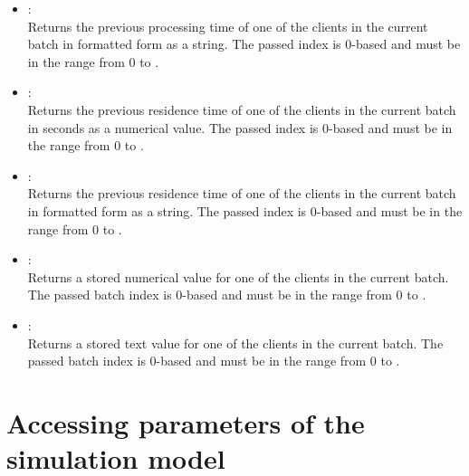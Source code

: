 \begin{itemize}
\item
{}:\\
Returns the previous processing time of one of the clients in the current batch in formatted form as a string.
The passed index is 0-based and must be in the range from 0 to .
	 
\item
{}:\\
Returns the previous residence time of one of the clients in the current batch in seconds as a numerical value.
The passed index is 0-based and must be in the range from 0 to .

\item
{}:\\
Returns the previous residence time of one of the clients in the current batch in formatted form as a string.
The passed index is 0-based and must be in the range from 0 to .

\item
{}:\\
Returns a stored numerical value for one of the clients in the current batch.
The passed batch index is 0-based and must be in the range from 0 to .

\item
{}:\\
Returns a stored text value for one of the clients in the current batch.
The passed batch index is 0-based and must be in the range from 0 to .

\end{itemize}

\section{Accessing parameters of the simulation model}

